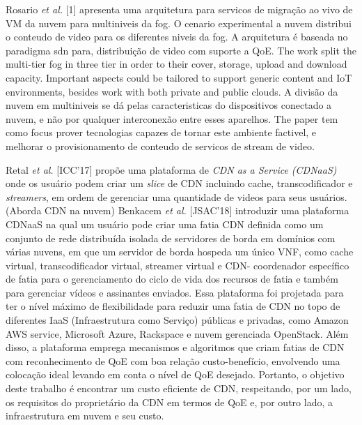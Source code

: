 Rosario \textit{et al.} [1] apresenta uma arquitetura para servicos de migração ao vivo de VM da nuvem para multiniveis da fog. O cenario experimental a nuvem distribui o conteudo de video para os diferentes niveis da fog. A arquitetura é baseada no paradigma sdn para, distribuição de video com suporte a QoE. 
The work split the multi-tier fog in three tier in order to their cover, storage, upload and download capacity. Important aspects could be tailored to support generic content and IoT environments, besides work with both private and public clouds. A divisão da nuvem em multiniveis se dá pelas caracteristicas do  dispositivos conectado a nuvem, e não por qualquer interconexão entre esses aparelhos. The paper tem como focus prover tecnologias capazes de tornar este ambiente factivel, e melhorar o provisionamento de conteudo de servicos de stream de video.


Retal \textit{et al.} [ICC'17] propõe uma plataforma de \textit{CDN as a Service (CDNaaS)} onde os usuário podem criar um \textit{slice} de CDN incluindo cache, transcodificador e \textit{streamers}, em ordem de gerenciar uma quantidade de videos para seus usuários. (Aborda CDN na nuvem)
Benkacem \textit{et al.} [JSAC'18] introduzir uma plataforma CDNaaS na qual um usuário pode criar uma fatia CDN definida como um conjunto de rede distribuída isolada de servidores de borda em domínios com várias nuvens, em que um servidor de borda hospeda um único VNF, como cache virtual, transcodificador virtual, streamer virtual e CDN- coordenador específico de fatia para o gerenciamento do ciclo de vida dos recursos de fatia e também para gerenciar vídeos e assinantes enviados. Essa plataforma foi projetada para ter o nível máximo de flexibilidade para reduzir uma fatia de CDN no topo de diferentes IaaS (Infraestrutura como Serviço) públicas e privadas, como Amazon AWS service, Microsoft Azure, Rackspace e nuvem gerenciada OpenStack. Além disso, a plataforma emprega mecanismos e algoritmos que criam fatias de CDN com reconhecimento de QoE com boa relação custo-benefício, envolvendo uma colocação ideal levando em conta o nível de QoE desejado. Portanto, o objetivo deste trabalho é encontrar um custo eficiente de CDN, respeitando, por um lado, os requisitos do proprietário da CDN em termos de QoE e, por outro lado, a infraestrutura em nuvem e seu custo.
